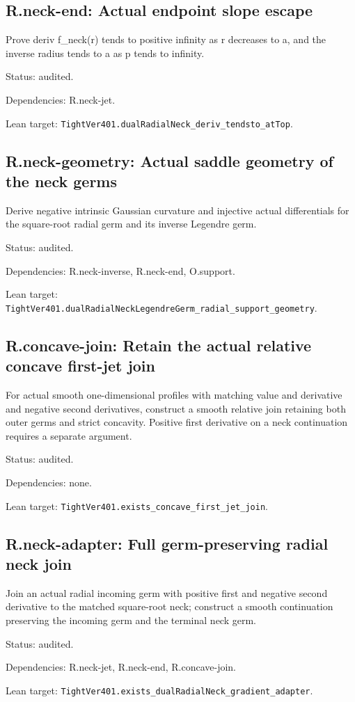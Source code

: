 \documentclass{article}
\begin{document}
\subsection*{R.neck-end: Actual endpoint slope escape}
Prove deriv f\_neck(r) tends to positive infinity as r decreases to a, and the inverse radius tends to a as p tends to infinity.
\par Status: audited.
\par Dependencies: R.neck-jet.
\par Lean target: \texttt{TightVer401.dualRadialNeck\_deriv\_tendsto\_atTop}.
\subsection*{R.neck-geometry: Actual saddle geometry of the neck germs}
Derive negative intrinsic Gaussian curvature and injective actual differentials for the square-root radial germ and its inverse Legendre germ.
\par Status: audited.
\par Dependencies: R.neck-inverse, R.neck-end, O.support.
\par Lean target: \texttt{TightVer401.dualRadialNeckLegendreGerm\_radial\_support\_geometry}.
\subsection*{R.concave-join: Retain the actual relative concave first-jet join}
For actual smooth one-dimensional profiles with matching value and derivative and negative second derivatives, construct a smooth relative join retaining both outer germs and strict concavity. Positive first derivative on a neck continuation requires a separate argument.
\par Status: audited.
\par Dependencies: none.
\par Lean target: \texttt{TightVer401.exists\_concave\_first\_jet\_join}.
\subsection*{R.neck-adapter: Full germ-preserving radial neck join}
Join an actual radial incoming germ with positive first and negative second derivative to the matched square-root neck; construct a smooth continuation preserving the incoming germ and the terminal neck germ.
\par Status: audited.
\par Dependencies: R.neck-jet, R.neck-end, R.concave-join.
\par Lean target: \texttt{TightVer401.exists\_dualRadialNeck\_gradient\_adapter}.
\end{document}

